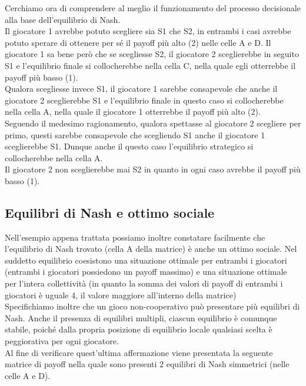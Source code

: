 Cerchiamo ora di comprendere al meglio il funzionamento del processo decisionale alla base dell'equilibrio di Nash.\\
Il giocatore 1 avrebbe potuto scegliere sia S1 che S2, in entrambi i casi avrebbe potuto sperare di ottenere per sé il payoff più alto (2) nelle celle A e D. Il giocatore 1 sa bene però che se scegliesse S2, il giocatore 2 sceglierebbe in seguito S1 e l'equilibrio finale si collocherebbe nella cella C, nella quale egli otterrebbe il payoff più basso (1).\\
Qualora scegliesse invece S1, il giocatore 1 sarebbe consapevole che anche il giocatore 2 sceglierebbe S1 e l'equilibrio finale in questo caso si collocherebbe nella cella A, nella quale il giocatore 1 otterrebbe il payoff più alto (2).\\
Seguendo il medesimo ragionamento, qualora spettasse al giocatore 2 scegliere per primo, questi sarebbe consapevole che scegliendo S1 anche il giocatore 1 sceglierebbe S1. Dunque anche il questo caso l'equilibrio strategico si collocherebbe nella cella A.\\
Il giocatore 2 non sceglierebbe mai S2 in quanto in ogni caso avrebbe il payoff più basso (1).\newline

\subsection{Equilibri di Nash e ottimo sociale}
\justify
Nell'esempio appena trattata possiamo inoltre constatare facilmente che l'equilibrio di Nash trovato (cella A della matrice) è anche un ottimo sociale. Nel suddetto equilibrio coesistono una situazione ottimale per entrambi i giocatori (entrambi i giocatori possiedono un payoff massimo) e una situazione ottimale per l'intera collettività (in quanto la somma dei valori di payoff di entrambi i giocatori è uguale 4, il valore maggiore all'interno della matrice)\\
Specifichiamo inoltre che un gioco non-cooperativo può presentare più equilibri di Nash. Anche il presenza di equilibri multipli, ciascun equilibrio è comunque stabile, poiché dalla propria posizione di equilibrio locale qualsiasi scelta è peggiorativa per ogni giocatore.\\
Al fine di verificare quest'ultima affermazione viene presentata la seguente matrice di payoff nella quale sono presenti 2 equilibri di Nash simmetrici (nelle celle A e D).\\

